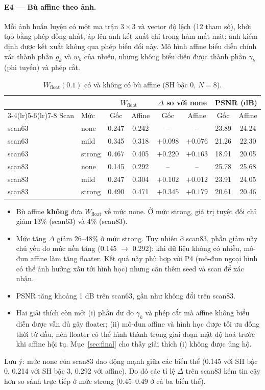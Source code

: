 \documentclass[11pt,a4paper]{article}
\begin{document}
\paragraph{E4 --- Bù affine theo ảnh.} Mỗi ảnh huấn luyện có một ma trận $3\times3$ và vector độ lệch (12 tham số), khởi tạo bằng phép đồng nhất, áp lên ảnh kết xuất chỉ trong hàm mất mát; ảnh kiểm định được kết xuất không qua phép biến đổi này. Mô hình affine biểu diễn chính xác thành phần $g_k$ và $w_k$ của nhiễu, nhưng không biểu diễn được thành phần $\gamma_k$ (phi tuyến) và phép cắt.
\begin{table}[H]
\centering\small
\caption{$W_{\text{float}}(0.1)$ có và không có bù affine (SH bậc 0, $N=8$).}
\begin{tabular}{@{}llcccccc@{}}
\toprule
& & \multicolumn{2}{c}{$W_{\text{float}}$} & \multicolumn{2}{c}{$\Delta$ so với none} & \multicolumn{2}{c}{PSNR (dB)} \\
\cmidrule(lr){3-4}\cmidrule(lr){5-6}\cmidrule(lr){7-8}
Scan & Mức & Gốc & Affine & Gốc & Affine & Gốc & Affine \\
\midrule
scan63 & none & 0.247 & 0.242 & -- & -- & 23.89 & 24.24 \\
scan63 & mild & 0.345 & 0.318 & $+0.098$ & $+0.076$ & 21.26 & 22.30 \\
scan63 & strong & 0.467 & 0.405 & $+0.220$ & $+0.163$ & 18.91 & 20.05 \\
scan83 & none & 0.145 & 0.292 & -- & -- & 25.78 & 25.68 \\
scan83 & mild & 0.247 & 0.304 & $+0.102$ & $+0.012$ & 23.91 & 24.05 \\
scan83 & strong & 0.490 & 0.471 & $+0.345$ & $+0.179$ & 20.61 & 20.46 \\
\bottomrule
\end{tabular}
\end{table}
\begin{itemize}
  \item Bù affine \textbf{không} đưa $W_{\text{float}}$ về mức none. Ở mức strong, giá trị tuyệt đối chỉ giảm 13\% (scan63) và 4\% (scan83).
  \item Mức tăng $\Delta$ giảm 26--48\% ở mức strong. Tuy nhiên ở scan83, phần giảm này chủ yếu do mức nền tăng (0.145 $\to$ 0.292): khi dữ liệu không có nhiễu, mô-đun affine làm tăng floater. Kết quả này phù hợp với P4 (mô-đun ngoại hình có thể ảnh hưởng xấu tới hình học) nhưng cần thêm seed và scan để xác nhận.
  \item PSNR tăng khoảng 1 dB trên scan63, gần như không đổi trên scan83.
  \item Hai giải thích còn mở: (i) phần dư do $\gamma_k$ và phép cắt mà affine không biểu diễn được vẫn đủ gây floater; (ii) mô-đun affine và hình học được tối ưu đồng thời từ đầu, nên floater có thể hình thành trong giai đoạn mật độ hoá trước khi affine hội tụ. Mục~\ref{sec:final} cho thấy giải thích (i) không được ủng hộ.
\end{itemize}
Lưu ý: mức none của scan83 dao động mạnh giữa các biến thể (0.145 với SH bậc 0, 0.214 với SH bậc 3, 0.292 với affine). Do đó các tỉ lệ $\Delta$ trên scan83 kém tin cậy hơn so sánh trực tiếp ở mức strong (0.45--0.49 ở cả ba biến thể).
\end{document}
